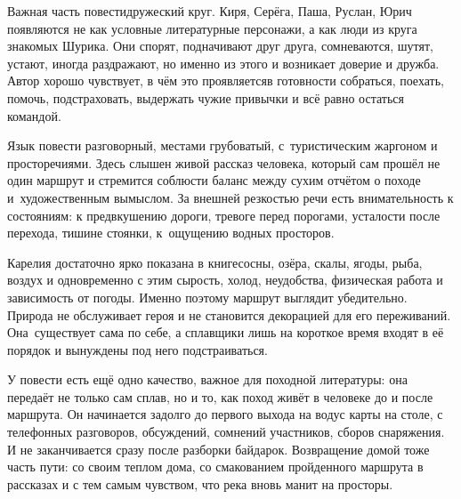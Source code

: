 \clearpage               

\thispagestyle{plain}   %
%
%

{\small%

\vspace{5mm}

Важная часть повести\mdash дружеский круг. Киря, Серёга, Паша, Руслан, Юрич появляются не как условные литературные персонажи, а как люди из круга знакомых Шурика. Они спорят, подначивают друг друга, сомневаются, шутят, устают, иногда раздражают, но именно из этого и возникает доверие и дружба. Автор хорошо чувствует, в чём это проявляется\mdash в готовности собраться, поехать, помочь, подстраховать, выдержать чужие привычки и всё равно остаться командой.

Язык повести разговорный, местами грубоватый, с~туристическим жаргоном и просторечиями. Здесь слышен живой рассказ человека, который сам прошёл не один маршрут и стремится соблюсти баланс между сухим отчётом о походе и~художественным вымыслом. За внешней резкостью речи есть внимательность к состояниям: к предвкушению дороги, тревоге перед порогами, усталости после перехода, тишине стоянки, к~ощущению водных просторов.

Карелия достаточно ярко показана в книге\mdash сосны, озёра, скалы, ягоды, рыба, воздух и одновременно с этим сырость, холод, неудобства, физическая работа и зависимость от погоды. Именно поэтому маршрут выглядит убедительно. Природа не обслуживает героя и не становится декорацией для его переживаний. Она~существует сама по себе, а сплавщики лишь на короткое время входят в её порядок и вынуждены под него подстраиваться.

У повести есть ещё одно качество, важное для походной литературы: она передаёт не только сам сплав, но и то, как поход живёт в человеке до и после маршрута. Он начинается задолго до первого выхода на воду\mdash с карты на столе, с телефонных разговоров, обсуждений, сомнений участников, сборов снаряжения. И не заканчивается сразу после разборки байдарок. Возвращение домой тоже часть пути: со своим теплом дома, со смакованием пройденного маршрута в рассказах и с тем самым чувством, что река вновь манит на просторы.
	
}

